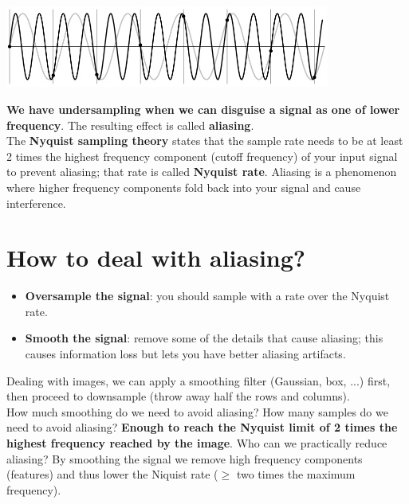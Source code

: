 \documentclass{article}
\begin{document}
\begin{center}
\includegraphics[width=0.8\textwidth]{images/undersampling_higher_freq.png}
\end{center}

\newpage

\textbf{We have undersampling when we can disguise a signal as one of lower frequency}. The resulting effect is called \textbf{aliasing}. \\

The \textbf{Nyquist sampling theory} states that the sample rate needs to be at least 2 times the highest frequency component (cutoff frequency) of your input signal to prevent aliasing; that rate is called \textbf{Nyquist rate}. Aliasing is a phenomenon where higher frequency components fold back into your signal and cause interference.

\section*{How to deal with aliasing?}

\begin{itemize}
    \item \textbf{Oversample the signal}: you should sample with a rate over the Nyquist rate.
    \item \textbf{Smooth the signal}: remove some of the details that cause aliasing; this causes information loss but lets you have better aliasing artifacts. 
\end{itemize}

Dealing with images, we can apply a smoothing filter (Gaussian, box, ...) first, then proceed to downsample (throw away half the rows and columns). \\

How much smoothing do we need to avoid aliasing? How many samples do we need to avoid aliasing? \textbf{Enough to reach the Nyquist limit of 2 times the highest frequency reached by the image}. Who can we practically reduce aliasing? By smoothing the signal we remove high frequency components (features) and thus lower the Niquist rate ($\geq$ two times the maximum frequency).

\newpage
\end{document}
